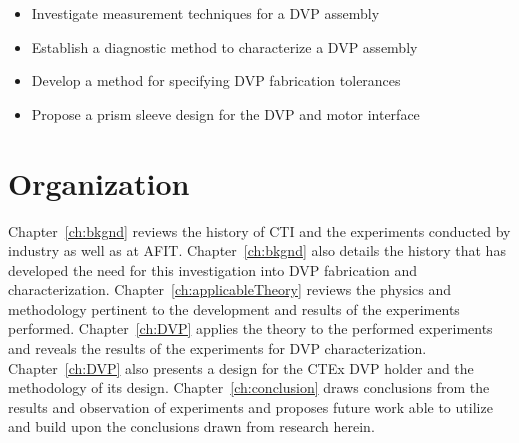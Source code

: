\begin{itemize}
\singlespace
\item{Investigate measurement techniques for a \acl{DVP} assembly}
\item{Establish a diagnostic method to characterize a \acl{DVP} assembly}
\item{Develop a method for specifying \acl{DVP} fabrication tolerances}
\item{Propose a prism sleeve design for the \acl{DVP} and motor interface}
\end{itemize}


\section{Organization}

Chapter~\ref{ch:bkgnd} reviews the history of \ac{CTI} and the experiments conducted by industry as well as at \ac{AFIT}. Chapter~\ref{ch:bkgnd} also details the history that has developed the need for this investigation into \ac{DVP} fabrication and characterization. Chapter~\ref{ch:applicableTheory} reviews the physics and methodology pertinent to the development and results of the experiments performed. Chapter~\ref{ch:DVP}  applies the theory to the performed experiments and reveals the results of the experiments for \ac{DVP} characterization. Chapter~\ref{ch:DVP} also presents a design for the \ac{CTEx} \ac{DVP} holder and the methodology of its design. Chapter~\ref{ch:conclusion} draws conclusions from the results and observation of experiments and proposes future work able to utilize and build upon the conclusions drawn from research herein.
